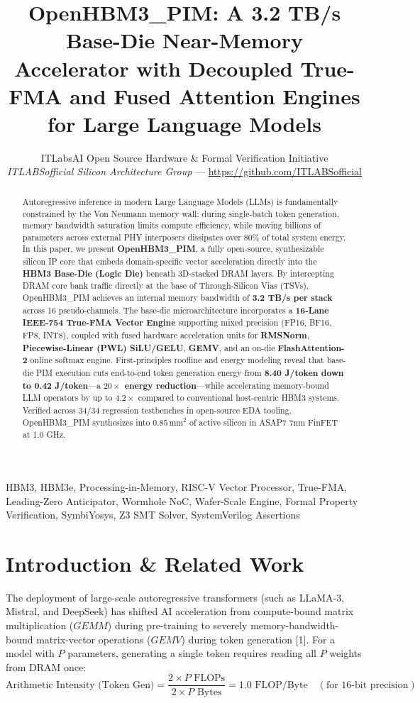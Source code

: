 \documentclass[journal,10pt,twocolumn]{IEEEtran}
\title{OpenHBM3\_PIM: A 3.2 TB/s Base-Die Near-Memory Accelerator with Decoupled True-FMA and Fused Attention Engines for Large Language Models}
\author{ITLabsAI Open Source Hardware \& Formal Verification Initiative\\
\textit{ITLABSofficial Silicon Architecture Group} --- \url{https://github.com/ITLABSofficial}}
\begin{document}
\maketitle
\begin{abstract}
Autoregressive inference in modern Large Language Models (LLMs) is fundamentally constrained by the Von Neumann memory wall: during single-batch token generation, memory bandwidth saturation limits compute efficiency, while moving billions of parameters across external PHY interposers dissipates over 80\% of total system energy. In this paper, we present \textbf{OpenHBM3\_PIM}, a fully open-source, synthesizable silicon IP core that embeds domain-specific vector acceleration directly into the \textbf{HBM3 Base-Die (Logic Die)} beneath 3D-stacked DRAM layers. By intercepting DRAM core bank traffic directly at the base of Through-Silicon Vias (TSVs), OpenHBM3\_PIM achieves an internal memory bandwidth of \textbf{3.2 TB/s per stack} across 16 pseudo-channels. The base-die microarchitecture incorporates a \textbf{16-Lane IEEE-754 True-FMA Vector Engine} supporting mixed precision (FP16, BF16, FP8, INT8), coupled with fused hardware acceleration units for \textbf{RMSNorm}, \textbf{Piecewise-Linear (PWL) SiLU/GELU}, \textbf{GEMV}, and an on-die \textbf{FlashAttention-2} online softmax engine. First-principles roofline and energy modeling reveal that base-die PIM execution cuts end-to-end token generation energy from \textbf{8.40 J/token down to 0.42 J/token}—a \textbf{$20\times$ energy reduction}—while accelerating memory-bound LLM operators by up to \textbf{$4.2\times$} compared to conventional host-centric HBM3 systems. Verified across 34/34 regression testbenches in open-source EDA tooling, OpenHBM3\_PIM synthesizes into \textbf{$0.85\,\text{mm}^2$} of active silicon in ASAP7 7nm FinFET at 1.0 GHz.
\end{abstract}
\begin{IEEEkeywords}
HBM3, HBM3e, Processing-in-Memory, RISC-V Vector Processor, True-FMA, Leading-Zero Anticipator, Wormhole NoC, Wafer-Scale Engine, Formal Property Verification, SymbiYosys, Z3 SMT Solver, SystemVerilog Assertions
\end{IEEEkeywords}


\section{Introduction \& Related Work}

The deployment of large-scale autoregressive transformers (such as LLaMA-3, Mistral, and DeepSeek) has shifted AI acceleration from compute-bound matrix multiplication ($GEMM$) during pre-training to severely memory-bandwidth-bound matrix-vector operations ($GEMV$) during token generation [1]. For a model with $P$ parameters, generating a single token requires reading all $P$ weights from DRAM once:
$$\text{Arithmetic Intensity (Token Gen)} = \frac{2 \times P \text{ FLOPs}}{2 \times P \text{ Bytes}} = 1.0 \text{ FLOP/Byte} \quad (\text{for 16-bit precision})$$
\end{document}
